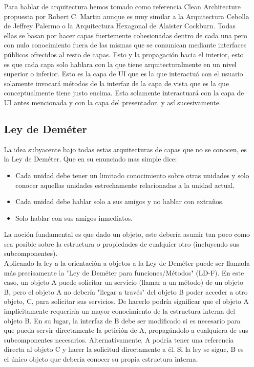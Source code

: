 \documentclass[../pfc.tex]{subfiles}
\begin{document}
	Para hablar de arquitectura hemos tomado como referencia Clean Architecture\cite{cleanarch} propuesta por Robert C. Martin aunque es muy similar a la Arquitectura Cebolla de Jeffrey Palermo\cite{onion} o la Arquitectura Hexagonal de Alaister Cockburn\cite{onion}. Todas ellas se basan por hacer capas fuertemente cohesionadas dentro de cada una pero con nulo conocimiento fuera de las mismas que se comunican mediante interfaces públicos ofrecidos al resto de capas. Esto y la propagación hacia el interior, esto es que cada capa solo hablara con la que tiene arquitecturalmente en un nivel superior o inferior. Esto es la capa de UI que es la que interactuá con el usuario solamente invocará métodos de la interfaz de la capa de vista que es la que conceptualmente tiene justo encima. Esta solamente interactuará con la capa de UI antes mencionada y con la capa del presentador, y así sucesivamente. \\
	
	\subsection{Ley de Deméter}
	
	La idea subyacente bajo todas estas arquitecturas de capas que no se conocen, es la Ley de Deméter. Que en su enunciado mas simple dice:
		\begin{itemize} 
			\item Cada unidad debe tener un limitado conocimiento sobre otras unidades y solo conocer aquellas unidades estrechamente relacionadas a la unidad actual.
			\item Cada unidad debe hablar solo a sus amigos y no hablar con extraños.
			\item Solo hablar con sus amigos inmediatos.
		\end{itemize}
	La noción fundamental es que dado un objeto, este debería asumir tan poco como sea posible sobre la estructura o propiedades de cualquier otro (incluyendo sus subcomponentes).\\
	
	Aplicando la ley a la orientación a objetos a la Ley de Deméter puede ser llamada más precisamente la "Ley de Deméter para funciones/Métodos" (LD-F). En este caso, un objeto A puede solicitar un servicio (llamar a un método) de un objeto B, pero el objeto A no debería "llegar a través" del objeto B poder acceder a otro objeto, C, para solicitar sus servicios. De hacerlo podría significar que el objeto A implícitamente requeriría un mayor conocimiento de la estructura interna del objeto B. En su lugar, la interfaz de B debe ser modificado si es necesario para que pueda servir directamente la petición de A, propagándolo a cualquiera de sus subcomponentes necesarios. Alternativamente, A podría tener una referencia directa al objeto C y hacer la solicitud directamente a él. Si la ley se sigue, B es el único objeto que debería conocer su propia estructura interna.\\
	
\end{document}
